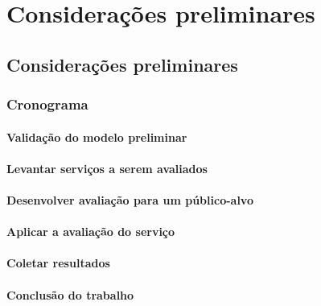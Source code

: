 \chapter[Considerações preliminares]{Considerações preliminares}
\section{Considerações preliminares}
	\subsection{Cronograma}
		\subsubsection{Validação do modelo preliminar}
		\subsubsection{Levantar serviços a serem avaliados}
		\subsubsection{Desenvolver avaliação para um público-alvo}
		\subsubsection{Aplicar a avaliação do serviço}
		\subsubsection{Coletar resultados}
		\subsubsection{Conclusão do trabalho}
